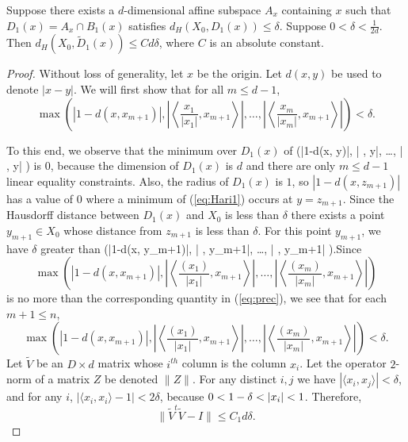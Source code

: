 \documentclass[final, 12pt]{colt2018} %
\begin{document}
\begin{lemma}
Suppose there exists a $d$-dimensional affine subspace $A_x$ containing $x$ such that $D_1(x) = A_x \cap B_1(x)$ satisfies $d_H(X_0, D_1(x)) \leq \delta$.
Suppose $0 < \delta < \frac{1}{2d}$. Then $d_H(X_0, \tilde{D}_1(x)) \leq  C{d}\delta$, where $C$ is an absolute constant.
\end{lemma}
\begin{proof}
Without loss of generality, let $x$ be the origin. Let $d(x, y)$ be used to denote $|x-y|$.
We will first show that for all $m \leq d-1$,
$$\max\left(|1-d(x, x_{m+1})|, \left | \left\langle \frac{x_1}{|x_1|}, x_{m+1}\right\rangle \right |, \dots, \left | \left\langle \frac{x_m}{|x_m|}, x_{m+1}\right\rangle \right | \right) < \delta.$$

To this end, we observe that the minimum over  $D_1(x)$ of
\beq\max\left(|1-d(x, y)|, \left | \left\langle {}, y\right\rangle \right |, \dots, \left | \left\langle {}, y\right\rangle \right | \right)\label{eq:Hari1}\eeq
is $0$, because the dimension of $D_1(x)$ is $d$ and there are only $m \leq d-1$ linear equality constraints. Also, the radius of $D_1(x)$ is $1$, so $|1 - d(x, z_{m+1})|$ has a value of $0$ where a minimum of (\ref{eq:Hari1}) occurs at $y = z_{m+1}$.
Since the Hausdorff distance between $D_1(x)$ and $X_0$ is less than $ \delta$ there exists a point $y_{m+1} \in X_0$ whose distance from $z_{m+1}$ is less than $\delta$. For this point $y_{m+1}$, we have $\delta$ greater than
\beq \label{eq:prec}
\max\left(|1-d(x, y_{m+1})|, \left | \left\langle {}, y_{m+1}\right\rangle \right |, \dots, \left | \left\langle {}, y_{m+1}\right\rangle \right | \right).\eeq Since
$$\max\left(|1-d(x, x_{m+1})|, \left | \left\langle \frac{(x_1)}{|x_1|}, x_{m+1}\right\rangle \right |, \dots, \left | \left\langle \frac{(x_m)}{|x_m|}, x_{m+1}\right\rangle \right | \right)
$$ is no more than the corresponding quantity in (\ref{eq:prec}), we see that for each $m+1 \leq n$,
$$\max\left(|1-d(x, x_{m+1})|, \left | \left\langle \frac{(x_1)}{|x_1|}, x_{m+1}\right\rangle \right |, \dots, \left | \left\langle \frac{(x_m)}{|x_m|}, x_{m+1}\right\rangle \right | \right) < \delta.$$
Let $\tilde V$ be an $D \times d$ matrix whose $i^{th}$ column is the column $x_i$. Let the operator $2$-norm of a matrix $Z$ be denoted $\|Z\|$.  For any distinct $i,j$ we have  $|\langle x_i , x_j \rangle|<\delta$, and for any $i$, $|\langle x_i, x_i\rangle - 1|<2\delta$, because $0 < 1-{\mathbf{\delta}} < |x_i| < 1$. Therefore,  $$\|{\tilde V}^t {\tilde V} - I\| \leq C_1 d\delta.$$

\end{proof}
\end{document}
